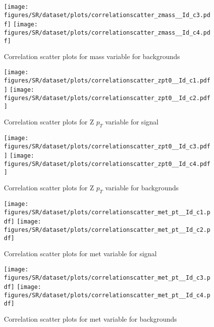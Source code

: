 \begin{figure}[!htb]%
\centering
\texttt{[image: figures/SR/dataset/plots/correlationscatter\_zmass\_\_Id\_c3.pdf]}
\texttt{[image: figures/SR/dataset/plots/correlationscatter\_zmass\_\_Id\_c4.pdf]}
\caption{ Correlation scatter plots for \Zll mass variable for backgrounds}%
\label{fig:correlations_SR_zmass_BG}                                                       
\end{figure}



\begin{figure}[!htb]%
\centering
\texttt{[image: figures/SR/dataset/plots/correlationscatter\_zpt0\_\_Id\_c1.pdf]}
\texttt{[image: figures/SR/dataset/plots/correlationscatter\_zpt0\_\_Id\_c2.pdf]}
\caption{ Correlation scatter plots for Z $p_{T}$  variable for signal}%
\label{fig:correlations_SR_zpt_S}                                                       
\end{figure}



\begin{figure}[!htb]%
\centering
\texttt{[image: figures/SR/dataset/plots/correlationscatter\_zpt0\_\_Id\_c3.pdf]}
\texttt{[image: figures/SR/dataset/plots/correlationscatter\_zpt0\_\_Id\_c4.pdf]}
\caption{ Correlation scatter plots for Z $p_{T}$ variable for backgrounds}%
\label{fig:correlations_SR_zpt_BG}                                                       
\end{figure}


\begin{figure}[!htb]%
\centering
\texttt{[image: figures/SR/dataset/plots/correlationscatter\_met\_pt\_\_Id\_c1.pdf]}
\texttt{[image: figures/SR/dataset/plots/correlationscatter\_met\_pt\_\_Id\_c2.pdf]}
\caption{ Correlation scatter plots for met variable for signal}%
\label{fig:correlations_SR_met_pt_S}                                                       
\end{figure}



\begin{figure}[!htb]%
\centering
\texttt{[image: figures/SR/dataset/plots/correlationscatter\_met\_pt\_\_Id\_c3.pdf]}
\texttt{[image: figures/SR/dataset/plots/correlationscatter\_met\_pt\_\_Id\_c4.pdf]}
\caption{ Correlation scatter plots for met variable for backgrounds}%
\label{fig:correlations_SR_met_pt_BG}                                                       
\end{figure}





